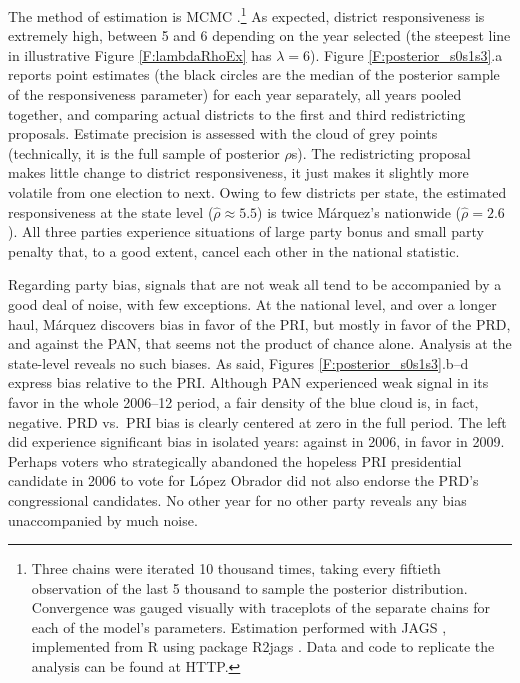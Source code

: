 \documentclass[letter,12pt]{article}
\begin{document}
The  method of estimation is MCMC \citep{jackman.2000}.\footnote{Three chains were iterated 10 thousand times, taking every fiftieth observation of the last 5 thousand to sample the posterior distribution. Convergence was gauged visually with traceplots of the separate chains for each of the model's parameters. Estimation performed with JAGS \citep{jags.cite}, implemented from R \citep{r.cite} using package R2jags \citep{r.r2jags}. Data and code to replicate the analysis can be found at HTTP.} As expected, district responsiveness is extremely high, between 5 and 6 depending on the year selected (the steepest line in illustrative Figure \ref{F:lambdaRhoEx} has $\lambda=6$). Figure \ref{F:posterior_s0s1s3}.a reports point estimates (the black circles are the median of the posterior sample of the responsiveness parameter) for each year separately, all years pooled together, and comparing actual districts to the first and third redistricting proposals. Estimate precision is assessed with the cloud of grey points (technically, it is the full sample of posterior $\rho$s). The redistricting proposal makes little change to district responsiveness, it just makes it slightly more volatile from one election to next. Owing to few districts per state, the estimated responsiveness at the state level ($\hat{\rho} \approx 5.5$) is twice M\'arquez's nationwide ($\hat{\rho} = 2.6$). All three parties experience situations of large party bonus and small party penalty that, to a good extent, cancel each other in the national statistic.

Regarding party bias, signals that are not weak all tend to be accompanied by a good deal of noise, with few exceptions. At the national level, and over a longer haul, M\'arquez discovers bias in favor of the PRI, but mostly in favor of the PRD, and against the PAN, that seems not the product of chance alone. Analysis at the state-level reveals no such biases. As said, Figures \ref{F:posterior_s0s1s3}.b--d express bias relative to the PRI. Although PAN experienced weak signal in its favor in the whole 2006--12 period, a fair density of the blue cloud is, in fact, negative. PRD vs.\ PRI bias is clearly centered at zero in the full period. The left did experience significant bias in isolated years: against in 2006, in favor in 2009. Perhaps voters who strategically abandoned the hopeless PRI presidential candidate in 2006 to vote for L\'opez Obrador did not also endorse the PRD's congressional candidates. No other year for no other party reveals any bias unaccompanied by much noise.
\end{document}
